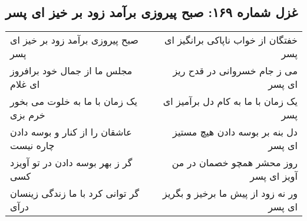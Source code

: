 \begin{center}
\section*{غزل شماره ۱۶۹: صبح پیروزی برآمد زود بر خیز ای پسر}
\label{sec:169}
\begin{longtable}{l p{0.5cm} r}
صبح پیروزی برآمد زود بر خیز ای پسر
&&
خفتگان از خواب ناپاکی برانگیز ای پسر
\\
مجلس ما از جمال خود برافروز ای غلام
&&
می ز جام خسروانی در قدح ریز ای پسر
\\
یک زمان با ما به خلوت می بخور خرم بزی
&&
یک زمان با ما به کام دل برآمیز ای پسر
\\
عاشقان را از کنار و بوسه دادن چاره نیست
&&
دل بنه بر بوسه دادن هیچ مستیز ای پسر
\\
گر ز بهر بوسه دادن در تو آویزد کسی
&&
روز محشر همچو خصمان در من آویز ای پسر
\\
گر توانی کرد با ما زندگی زینسان درآی
&&
ور نه زود از پیش ما برخیز و بگریز ای پسر
\\
\end{longtable}
\end{center}
